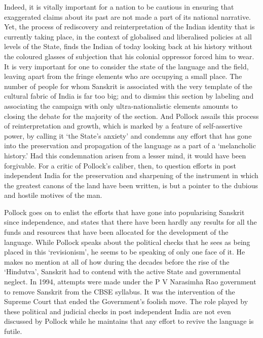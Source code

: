 Indeed, it is vitally important for a nation to be cautious in ensuring that exaggerated claims about its past are not made a part of its national narrative. Yet, the process of rediscovery and reinterpretation of the Indian identity that is currently taking place, in the context of globalised and liberalised policies at all levels of the State, finds the Indian of today looking back at his history without the coloured glasses of subjection that his colonial oppressor forced him to wear.  It is very important for one to consider the state of the language and the field, leaving apart from the fringe elements who are occupying a small place. The number of people for whom Sanskrit is associated with the very template of the cultural fabric of India is far too big; and to dismiss this section by labeling and associating the campaign with only ultra-nationalistic elements amounts to closing the debate for the majority of the section. And Pollock assails this process of reinterpretation and growth, which is marked by a feature of self-assertive power, by calling it ‘the State’s anxiety’ and condemns any effort that has gone into the preservation and propagation of the language as a part of a ‘melancholic history.’ Had this condemnation arisen from a lesser mind, it would have been forgivable. For a critic of Pollock’s caliber, then, to question efforts in post independent India for the preservation and sharpening of the instrument in which the greatest canons of the land have been written, is but a pointer to the dubious and hostile motives of the man.

Pollock goes on to enlist the efforts that have gone into popularising Sanskrit since independence, and states that there have been hardly any results for all the funds and resources that have been allocated for the development of the language. While Pollock speaks about the political checks that he sees as being placed in this ‘revisionism’, he seems to be speaking of only one face of it. He makes no mention at all of how during the decades before the rise of the ‘Hindutva’, Sanskrit had to contend with the active State and governmental neglect. In 1994, attempts were made under the P V Narasimha Rao government to remove Sanskrit from the CBSE syllabus. It was the intervention of the Supreme Court that ended the Government’s foolish move. The role played by these political and judicial checks in post independent India are not even discussed by Pollock while he maintains that any effort to revive the language is futile.

